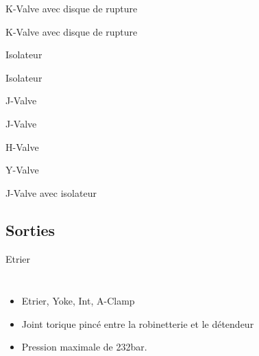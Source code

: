 \documentclass[aspectratio=1610,english,12pt]{beamer}
\begin{document}
\begin{frame}{K-Valve avec disque de rupture}
\end{frame}

\begin{frame}{K-Valve avec disque de rupture}
\end{frame}

\begin{frame}{Isolateur}
\end{frame}

\begin{frame}{Isolateur}
\end{frame}

\begin{frame}{J-Valve}
\end{frame}

\begin{frame}{J-Valve}
\end{frame}

\begin{frame}{H-Valve}
\end{frame}

\begin{frame}{Y-Valve}
\end{frame}

\begin{frame}{J-Valve avec isolateur}
\end{frame}

\subsection{Sorties}

\begin{frame}{Etrier}
	\begin{columns}[onlytextwidth]
			\begin{itemize}
			 	\item Etrier, Yoke, Int, A-Clamp
				\item Joint torique pincé entre la robinetterie et le détendeur
				\item Pression maximale de 232bar.
			\end{itemize}
	\end{columns}
\end{frame}
\end{document}
